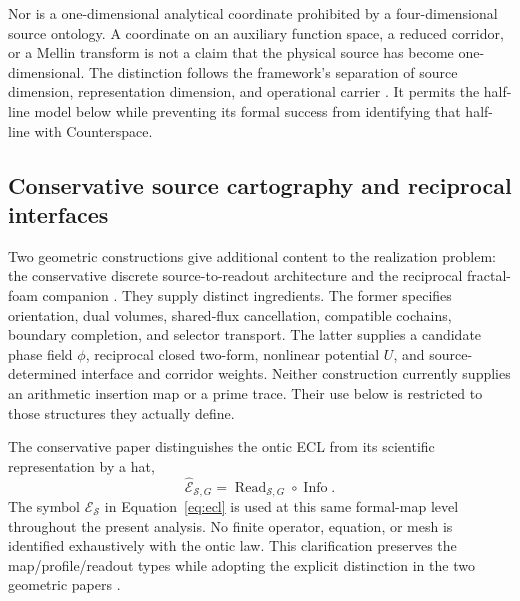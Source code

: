 \documentclass[11pt,letterpaper]{article}
\numberwithin{equation}{section}
\theoremstyle{definition}
\theoremstyle{remark}
\newcommand{\ES}{\mathcal E_{\mathcal S}}
\DeclareMathOperator{\Info}{Info}
\DeclareMathOperator{\Read}{Read}
\begin{document}
Nor is a one-dimensional analytical coordinate prohibited by a four-dimensional source ontology. A coordinate on an auxiliary function space, a reduced corridor, or a Mellin transform is not a claim that the physical source has become one-dimensional. The distinction follows the framework's separation of source dimension, representation dimension, and operational carrier \cite{tcgsfoundation,tcgsgeometry}. It permits the half-line model below while preventing its formal success from identifying that half-line with Counterspace.

\subsection{Conservative source cartography and reciprocal interfaces}
\label{subsec:sourcecompatible}
Two geometric constructions give additional content to the realization problem: the conservative discrete source-to-readout architecture and the reciprocal fractal-foam companion \cite{tcgsconservative,tcgsfoam}. They supply distinct ingredients. The former specifies orientation, dual volumes, shared-flux cancellation, compatible cochains, boundary completion, and selector transport. The latter supplies a candidate phase field $\phi$, reciprocal closed two-form, nonlinear potential $U$, and source-determined interface and corridor weights. Neither construction currently supplies an arithmetic insertion map or a prime trace. Their use below is restricted to those structures they actually define.

The conservative paper distinguishes the ontic ECL from its scientific representation by a hat,
\begin{equation}
 \widehat{\mathcal E}_{\mathcal S,G}
 =\Read_{\mathcal S,G}\circ\Info.
 \label{eq:hattedcartography}
\end{equation}
The symbol $\ES$ in Equation~\eqref{eq:ecl} is used at this same formal-map level throughout the present analysis. No finite operator, equation, or mesh is identified exhaustively with the ontic law. This clarification preserves the map/profile/readout types while adopting the explicit distinction in the two geometric papers \cite{tcgsconservative,tcgsfoam}.
\end{document}

